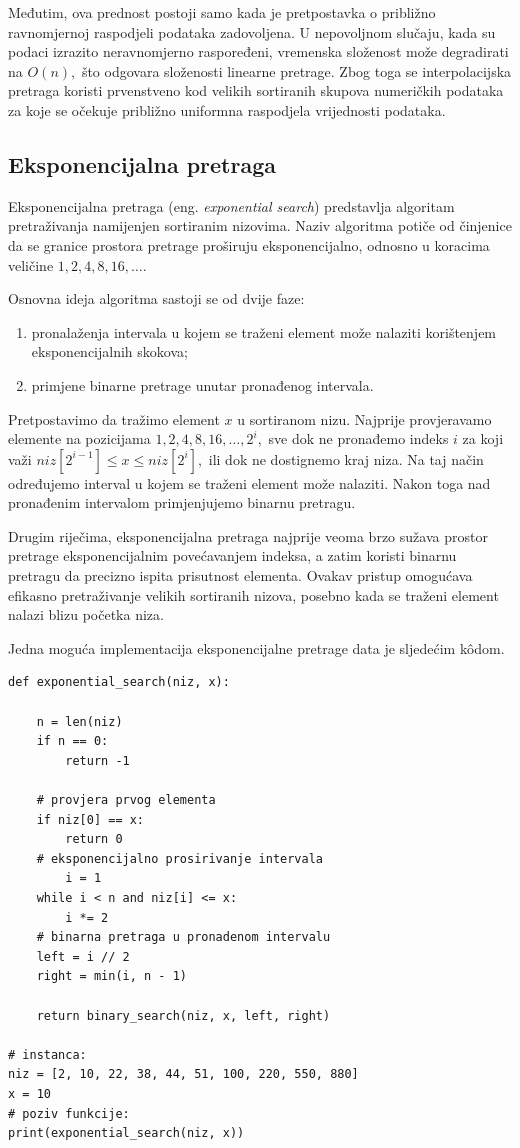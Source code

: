 Međutim, ova prednost postoji samo kada je pretpostavka o približno ravnomjernoj raspodjeli podataka zadovoljena. U nepovoljnom slučaju, kada su podaci izrazito neravnomjerno raspoređeni, vremenska složenost može degradirati na $O(n),$ što odgovara složenosti linearne pretrage. Zbog toga se interpolacijska pretraga koristi prvenstveno kod velikih sortiranih skupova numeričkih podataka za koje se očekuje približno uniformna raspodjela vrijednosti podataka.


\subsection{Eksponencijalna pretraga}

Eksponencijalna pretraga (eng. \emph{exponential search}) predstavlja algoritam pretraživanja namijenjen sortiranim nizovima. Naziv algoritma potiče od činjenice da se granice prostora pretrage proširuju eksponencijalno, odnosno u koracima veličine $1, 2, 4, 8, 16, \ldots$.

Osnovna ideja algoritma sastoji se od dvije faze:

\begin{enumerate}
	\item pronalaženja intervala u kojem se traženi element može nalaziti korištenjem eksponencijalnih skokova;
	\item primjene binarne pretrage unutar pronađenog intervala.
\end{enumerate}

Pretpostavimo da tražimo element $x$ u sortiranom nizu. Najprije provjeravamo elemente na pozicijama $1, 2, 4, 8, 16, \ldots, 2^i,$ sve dok ne pronađemo indeks $i$ za koji važi $niz[2^{i-1}] \leq x \leq niz[2^i],$  ili dok ne dostignemo kraj niza. Na taj način određujemo interval u kojem se traženi element može nalaziti. Nakon toga nad pronađenim intervalom primjenjujemo binarnu pretragu.

Drugim riječima, eksponencijalna pretraga najprije veoma brzo sužava prostor pretrage eksponencijalnim povećavanjem indeksa, a zatim koristi binarnu pretragu da precizno ispita prisutnost elementa. Ovakav pristup omogućava efikasno pretraživanje velikih sortiranih nizova, posebno kada se traženi element nalazi blizu početka niza.

Jedna moguća implementacija eksponencijalne pretrage data je sljedećim k\^odom.

\begin{verbatim}
def exponential_search(niz, x):

    n = len(niz)
    if n == 0:
        return -1

    # provjera prvog elementa
    if niz[0] == x:
        return 0
    # eksponencijalno prosirivanje intervala
        i = 1
    while i < n and niz[i] <= x:
        i *= 2
    # binarna pretraga u pronadenom intervalu
    left = i // 2
    right = min(i, n - 1)

    return binary_search(niz, x, left, right)

# instanca:
niz = [2, 10, 22, 38, 44, 51, 100, 220, 550, 880]
x = 10
# poziv funkcije:
print(exponential_search(niz, x))
\end{verbatim}

